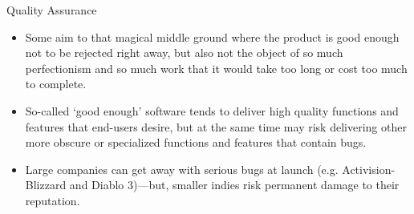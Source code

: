 \begin{frame}{Quality Assurance}
    \begin{itemize}
        \item Some aim to that magical middle ground where the product is good enough not to be rejected right away, but also not the object of so much 
        perfectionism and so much work that it would take too long or cost too much to complete. 
        \item So-called `good enough' software tends to deliver high quality functions and features that end-users desire, but at the same time may risk delivering
        other more obscure or specialized functions and features that contain bugs.
        \item Large companies can get away with serious bugs at launch (e.g. Activision-Blizzard and Diablo 3)---but, smaller indies risk permanent damage to their reputation.
    \end{itemize}
\end{frame}

